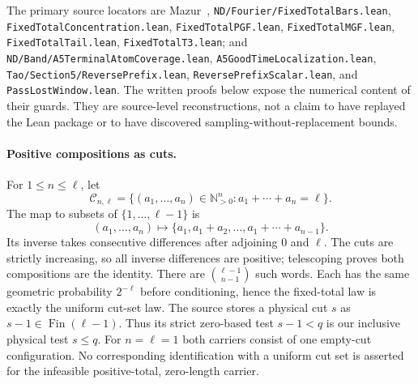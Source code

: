 \documentclass[11pt]{article}
\theoremstyle{remark}\newtheorem{remark}[proposition]{Remark}
\begin{document}
The primary source locators are Mazur~\cite{Mazur2026v2},
\texttt{ND/Fourier/FixedTotalBars.lean},
\texttt{FixedTotalConcentration.lean}, \texttt{FixedTotalPGF.lean},
\texttt{FixedTotalMGF.lean}, \texttt{FixedTotalTail.lean},
\texttt{FixedTotalT3.lean}; and
\texttt{ND/Band/A5TerminalAtomCoverage.lean},
\texttt{A5GoodTimeLocalization.lean},
\texttt{Tao/Section5/ReversePrefix.lean},
\texttt{ReversePrefixScalar.lean}, and \texttt{PassLostWindow.lean}.
The written proofs below expose the numerical content of their guards.
They are source-level reconstructions, not a claim to have replayed the
Lean package or to have discovered sampling-without-replacement bounds.

\paragraph{Positive compositions as cuts.}
For $1\le n\le\ell$, let
\[
 \mathcal C_{n,\ell}=\{(a_1,\ldots,a_n)\in\mathbb N_{>0}^n:
                       a_1+\cdots+a_n=\ell\}.
\]
The map to subsets of $\{1,\ldots,\ell-1\}$ is
\begin{equation}
 (a_1,\ldots,a_n)\longmapsto
 \{a_1,a_1+a_2,\ldots,a_1+\cdots+a_{n-1}\}.
 \label{eq:mazur-cuts}
\end{equation}
Its inverse takes consecutive differences after adjoining $0$ and $\ell$.
The cuts are strictly increasing, so all inverse differences are positive;
telescoping proves both compositions are the identity.
There are $\binom{\ell-1}{n-1}$ such words. Each has the same geometric
probability $2^{-\ell}$ before conditioning, hence the fixed-total law
is exactly the uniform cut-set law. The source stores a physical cut
$s$ as $s-1\in\operatorname{Fin}(\ell-1)$. Thus its strict zero-based
test $s-1<q$ is our inclusive physical test $s\le q$.
For $n=\ell=1$ both carriers consist of one empty-cut configuration.
No corresponding identification with a uniform cut set is asserted
for the infeasible positive-total, zero-length carrier.
\end{document}
